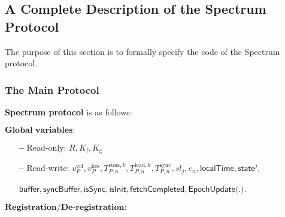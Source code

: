 \subsection{A Complete Description of the Spectrum Protocol}\label{subsec:a-complete-description-of-the-spectrum-protocol}
The purpose of this section is to formally specify the code of the Spectrum protocol.

\subsubsection{The Main Protocol}
\textbf{Spectrum protocol} is as follows:\label{apndx:spectrum-protocol}
\begin{protocol}
    \caption{$\textsf{Spectrum}(P, \mathcal{G}_{\text{Ledger}}, \mathcal{G}_{\text{ImpLClock}}, \mathcal{G}_{\text{RO}}, \mathcal{F}^{\Delta}_{\text{N-MC}})$}
    \begin{algorithmic}
        \State $\textbf{Global variables:}$
        \begin{itemize}
            \item[\textbf{--}] Read-only: $R, K_{\text{f}}, K_{\text{g}}$
            \item[\textbf{--}] Read-write: $v^{\text{vrf}}_P, v^{\text{kes}}_P, T^{\text{cons}, k}_{P, n}, T^{\text{lead}, k}_{P, n}, T^{\text{sync}}_{P, n},sl_j, e_n, \textsf{localTime}, \textsf{state}^{j},$
            \item[] $\textsf{buffer}, \textsf{syncBuffer}, \textsf{isSync}, \textsf{isInit}, \textsf{fetchCompleted}, \textsf{EpochUpdate(.)}$.
        \end{itemize}
        \State $\textbf{Registration/De-registration:}$


\end{algorithmic}
\end{protocol}
